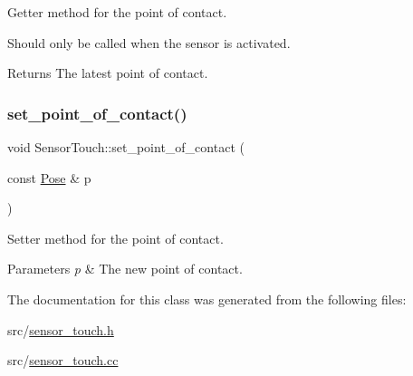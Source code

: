 Getter method for the point of contact. 

Should only be called when the sensor is activated.

\begin{DoxyReturn}{Returns}
The latest point of contact. 
\end{DoxyReturn}
\mbox{\label{class_sensor_touch_a2ef6d89a8e763e21f82e03a3033a490f}} 
\subsubsection{\texorpdfstring{set\+\_\+point\+\_\+of\+\_\+contact()}{set\_point\_of\_contact()}}
{\footnotesize\ttfamily void Sensor\+Touch\+::set\+\_\+point\+\_\+of\+\_\+contact (\begin{DoxyParamCaption}\item[{const \mbox{\hyperlink{struct_pose}{Pose}} \&}]{p }\end{DoxyParamCaption})\hspace{0.3cm}{\ttfamily [inline]}}



Setter method for the point of contact. 


\begin{DoxyParams}{Parameters}
{\em p} & The new point of contact. \\
\hline
\end{DoxyParams}


The documentation for this class was generated from the following files\+:\begin{DoxyCompactItemize}
\item 
src/\mbox{\hyperlink{sensor__touch_8h}{sensor\+\_\+touch.\+h}}\item 
src/\mbox{\hyperlink{sensor__touch_8cc}{sensor\+\_\+touch.\+cc}}\end{DoxyCompactItemize}
